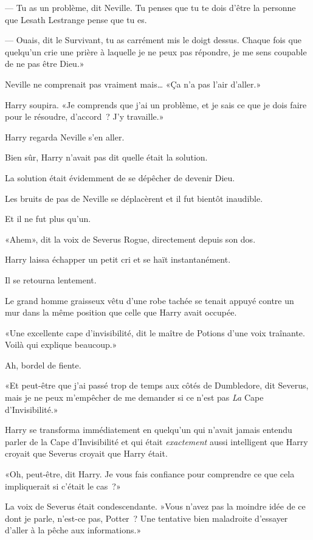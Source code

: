 --- Tu as un problème, dit Neville. Tu penses que tu te dois d'être la personne que Lesath Lestrange pense que tu es.

--- Ouais, dit le Survivant, tu as carrément mis le doigt dessus. Chaque fois que quelqu'un crie une prière à laquelle je ne peux pas répondre, je me sens coupable de ne pas être Dieu.»

Neville ne comprenait pas vraiment mais… «Ça n'a pas l'air d'aller.»

Harry soupira. «Je comprends que j'ai un problème, et je sais ce que je dois faire pour le résoudre, d'accord~? J'y travaille.»

\later

Harry regarda Neville s'en aller.

Bien sûr, Harry n'avait pas dit quelle était la solution.

La solution était évidemment de se dépêcher de devenir Dieu.

Les bruits de pas de Neville se déplacèrent et il fut bientôt inaudible.

Et il ne fut plus qu'un.

«Ahem», dit la voix de Severus Rogue, directement depuis son dos.

Harry laissa échapper un petit cri et se haït instantanément.

Il se retourna lentement.

Le grand homme graisseux vêtu d’une robe tachée se tenait appuyé contre un mur dans la même position que celle que Harry avait occupée.

«Une excellente cape d'invisibilité, dit le maître de Potions d'une voix traînante. Voilà qui explique beaucoup.»

Ah, bordel de fiente.

«Et peut-être que j'ai passé trop de temps aux côtés de Dumbledore, dit Severus, mais je ne peux m'empêcher de me demander si ce n'est pas \emph{La} Cape d'Invisibilité.»

Harry se transforma immédiatement en quelqu'un qui n'avait jamais entendu parler de la Cape d'Invisibilité et qui était \emph{exactement} aussi intelligent que Harry croyait que Severus croyait que Harry était.

«Oh, peut-être, dit Harry. Je vous fais confiance pour comprendre ce que cela impliquerait si c'était le cas~?»

La voix de Severus était condescendante. »Vous n'avez pas la moindre idée de ce dont je parle, n'est-ce pas, Potter~? Une tentative bien maladroite d'essayer d'aller à la pêche aux informations.»

